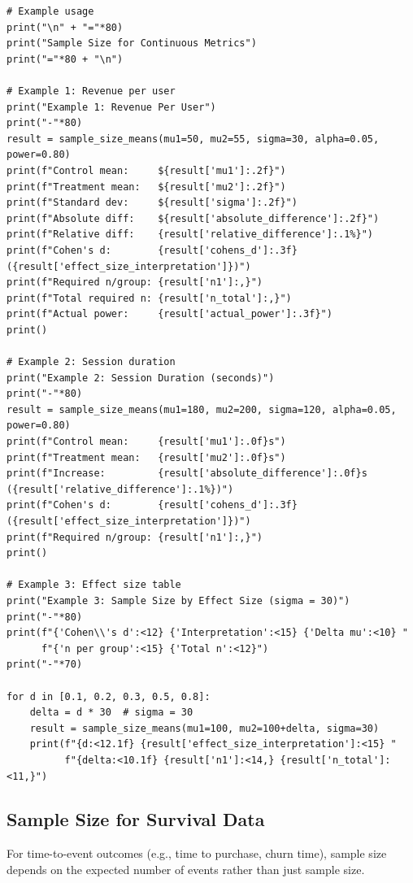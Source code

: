 \begin{lstlisting}
# Example usage
print("\n" + "="*80)
print("Sample Size for Continuous Metrics")
print("="*80 + "\n")

# Example 1: Revenue per user
print("Example 1: Revenue Per User")
print("-"*80)
result = sample_size_means(mu1=50, mu2=55, sigma=30, alpha=0.05, power=0.80)
print(f"Control mean:     ${result['mu1']:.2f}")
print(f"Treatment mean:   ${result['mu2']:.2f}")
print(f"Standard dev:     ${result['sigma']:.2f}")
print(f"Absolute diff:    ${result['absolute_difference']:.2f}")
print(f"Relative diff:    {result['relative_difference']:.1%}")
print(f"Cohen's d:        {result['cohens_d']:.3f} ({result['effect_size_interpretation']})")
print(f"Required n/group: {result['n1']:,}")
print(f"Total required n: {result['n_total']:,}")
print(f"Actual power:     {result['actual_power']:.3f}")
print()

# Example 2: Session duration
print("Example 2: Session Duration (seconds)")
print("-"*80)
result = sample_size_means(mu1=180, mu2=200, sigma=120, alpha=0.05, power=0.80)
print(f"Control mean:     {result['mu1']:.0f}s")
print(f"Treatment mean:   {result['mu2']:.0f}s")
print(f"Increase:         {result['absolute_difference']:.0f}s ({result['relative_difference']:.1%})")
print(f"Cohen's d:        {result['cohens_d']:.3f} ({result['effect_size_interpretation']})")
print(f"Required n/group: {result['n1']:,}")
print()

# Example 3: Effect size table
print("Example 3: Sample Size by Effect Size (sigma = 30)")
print("-"*80)
print(f"{'Cohen\\'s d':<12} {'Interpretation':<15} {'Delta mu':<10} "
      f"{'n per group':<15} {'Total n':<12}")
print("-"*70)

for d in [0.1, 0.2, 0.3, 0.5, 0.8]:
    delta = d * 30  # sigma = 30
    result = sample_size_means(mu1=100, mu2=100+delta, sigma=30)
    print(f"{d:<12.1f} {result['effect_size_interpretation']:<15} "
          f"{delta:<10.1f} {result['n1']:<14,} {result['n_total']:<11,}")
\end{lstlisting}

\subsection{Sample Size for Survival Data}

For time-to-event outcomes (e.g., time to purchase, churn time), sample size depends on the expected number of events rather than just sample size.

